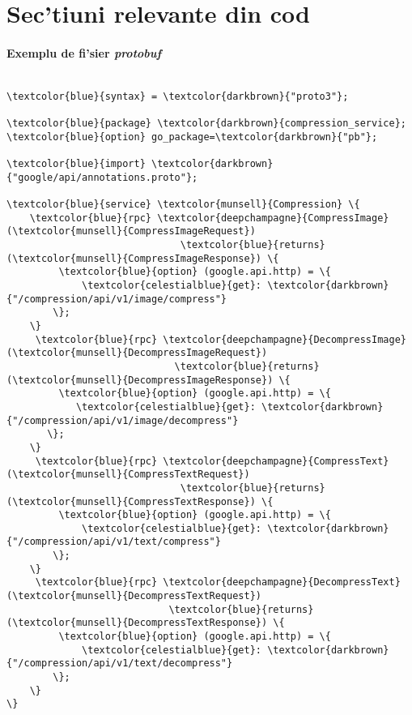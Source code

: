 
\appendix
\chapter{Sec'tiuni relevante din cod}\label{sectiuni_cod}

\subsubsection{Exemplu de fi'sier \textit{protobuf}}
\begin{tcolorbox}\label{proto_definition}
\scriptsize{
\begin{Verbatim}[commandchars=\\\{\}]

\textcolor{blue}{syntax} = \textcolor{darkbrown}{"proto3"};

\textcolor{blue}{package} \textcolor{darkbrown}{compression_service};
\textcolor{blue}{option} go_package=\textcolor{darkbrown}{"pb"};

\textcolor{blue}{import} \textcolor{darkbrown}{"google/api/annotations.proto"};

\textcolor{blue}{service} \textcolor{munsell}{Compression} \{
    \textcolor{blue}{rpc} \textcolor{deepchampagne}{CompressImage}(\textcolor{munsell}{CompressImageRequest})
                              \textcolor{blue}{returns} (\textcolor{munsell}{CompressImageResponse}) \{
         \textcolor{blue}{option} (google.api.http) = \{
             \textcolor{celestialblue}{get}: \textcolor{darkbrown}{"/compression/api/v1/image/compress"}
        \};
    \}
     \textcolor{blue}{rpc} \textcolor{deepchampagne}{DecompressImage}(\textcolor{munsell}{DecompressImageRequest})
                             \textcolor{blue}{returns} (\textcolor{munsell}{DecompressImageResponse}) \{
         \textcolor{blue}{option} (google.api.http) = \{
            \textcolor{celestialblue}{get}: \textcolor{darkbrown}{"/compression/api/v1/image/decompress"}
       \};
    \}
     \textcolor{blue}{rpc} \textcolor{deepchampagne}{CompressText}(\textcolor{munsell}{CompressTextRequest})
                              \textcolor{blue}{returns} (\textcolor{munsell}{CompressTextResponse}) \{
         \textcolor{blue}{option} (google.api.http) = \{
             \textcolor{celestialblue}{get}: \textcolor{darkbrown}{"/compression/api/v1/text/compress"}
        \};
    \}
     \textcolor{blue}{rpc} \textcolor{deepchampagne}{DecompressText}(\textcolor{munsell}{DecompressTextRequest}) 
                            \textcolor{blue}{returns} (\textcolor{munsell}{DecompressTextResponse}) \{
         \textcolor{blue}{option} (google.api.http) = \{
             \textcolor{celestialblue}{get}: \textcolor{darkbrown}{"/compression/api/v1/text/decompress"}
        \};
    \}
\}


\end{Verbatim}}
\end{tcolorbox}
